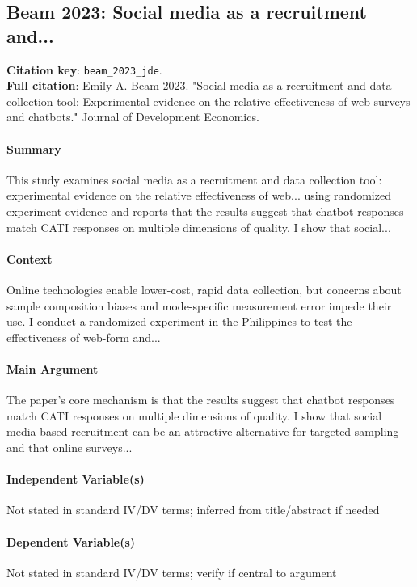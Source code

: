 \documentclass[12pt]{article}
\begin{document}
\subsection{Beam 2023: Social media as a recruitment and...}
\textbf{Citation key}: \texttt{beam\_2023\_jde}.\\
\textbf{Full citation}: Emily A. Beam 2023. "Social media as a recruitment and data collection tool: Experimental evidence on the relative effectiveness of web surveys and chatbots." Journal of Development Economics.

\paragraph{Summary} This study examines social media as a recruitment and data collection tool: experimental evidence on the relative effectiveness of web... using randomized experiment evidence and reports that the results suggest that chatbot responses match CATI responses on multiple dimensions of quality. I show that social...

\paragraph{Context} Online technologies enable lower-cost, rapid data collection, but concerns about sample composition biases and mode-specific measurement error impede their use. I conduct a randomized experiment in the Philippines to test the effectiveness of web-form and...

\paragraph{Main Argument} The paper's core mechanism is that the results suggest that chatbot responses match CATI responses on multiple dimensions of quality. I show that social media-based recruitment can be an attractive alternative for targeted sampling and that online surveys...

\paragraph{Independent Variable(s)} Not stated in standard IV/DV terms; inferred from title/abstract if needed

\paragraph{Dependent Variable(s)} Not stated in standard IV/DV terms; verify if central to argument
\end{document}
